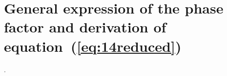 \documentclass[preprint]{iucr}              %
\newcommand{\inred}[1]{{\color{red}#1}}
\begin{document}



\section{General expression of the phase factor and derivation of equation~(\ref{eq:14reduced})}
\label{appendix:Deformation}.
\end{document}
